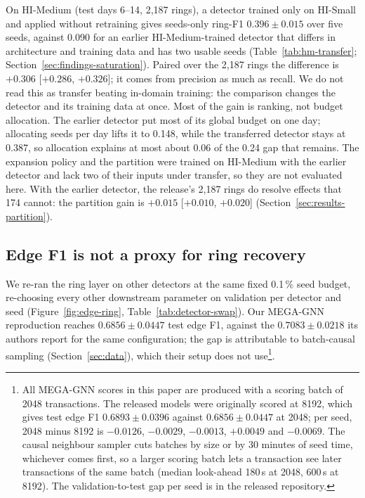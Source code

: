 On HI-Medium (test days 6--14, 2{,}187 rings), a detector trained only on HI-Small and applied
without retraining gives seeds-only ring-F1 $0.396 \pm 0.015$ over five seeds, against 0.090 for
an earlier HI-Medium-trained detector that differs in architecture and training data and has two
usable seeds (Table~\ref{tab:hm-transfer}; Section~\ref{sec:findings-saturation}). Paired over
the 2{,}187 rings the difference is $+0.306$ [$+0.286$, $+0.326$]; it comes from precision as
much as recall. We do not read this as transfer beating in-domain training: the comparison
changes the detector and its training data at once.
Most of the gain is ranking, not budget allocation. The earlier detector put most of its global
budget on one day; allocating seeds per day lifts it to 0.148, while the transferred detector
stays at 0.387, so allocation explains at most about 0.06 of the 0.24 gap that remains.
The expansion policy and the partition were trained on HI-Medium with the earlier detector and
lack two of their inputs under transfer, so they are not evaluated here. With the earlier
detector, the release's 2{,}187 rings do resolve effects that 174 cannot: the partition gain is
$+0.015$ [$+0.010$, $+0.020$] (Section~\ref{sec:results-partition}).



\subsection{Edge F1 is not a proxy for ring recovery}
\label{sec:results-swap}

We re-ran the ring layer on other detectors at the same fixed 0.1\,\% seed budget, re-choosing
every other downstream parameter on validation per detector and seed (Figure~\ref{fig:edge-ring}, Table~\ref{tab:detector-swap}).
Our MEGA-GNN reproduction reaches $0.6856 \pm 0.0447$ test edge F1, against the
$0.7083 \pm 0.0218$ its authors report for the same configuration; the gap is attributable to
batch-causal sampling (Section~\ref{sec:data}), which their setup does not use\footnote{All MEGA-GNN scores in this paper are produced with a scoring batch of 2048 transactions. The released models were originally scored at 8192, which gives test edge F1 $0.6893 \pm 0.0396$ against $0.6856 \pm 0.0447$ at 2048; per seed, 2048 minus 8192 is $-0.0126$, $-0.0029$, $-0.0013$, $+0.0049$ and $-0.0069$. The causal neighbour sampler cuts batches by size or by 30 minutes of seed time, whichever comes first, so a larger scoring batch lets a transaction see later transactions of the same batch (median look-ahead 180\,s at 2048, 600\,s at 8192). The validation-to-test gap per seed is in the released repository.}.

